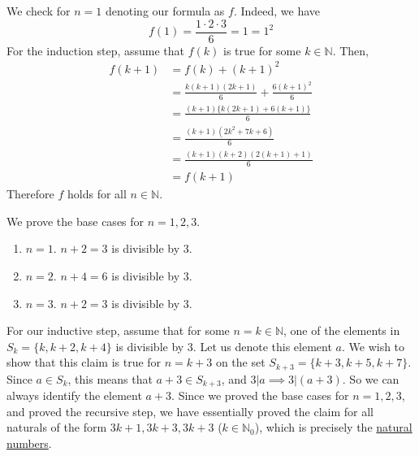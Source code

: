   \begin{exercise}
    We check for $n = 1$ denoting our formula as $f$. Indeed, we have 
    \begin{equation}
      f(1) = \frac{1 \cdot 2 \cdot 3}{6} = 1 = 1^2
    \end{equation} 
    For the induction step, assume that $f(k)$ is true for some $k \in \mathbb{N}$. Then, 
    \begin{align}
      f(k+1) & = f(k) + (k+1)^2 \\
             & = \frac{k (k + 1) (2k + 1)}{6} + \frac{6 (k+1)^2}{6} \\
             & = \frac{(k+1) \{ k (2k+1) + 6(k+1)\}}{6} \\
             & = \frac{(k+1) (2k^2 + 7k + 6)}{6} \\
             & = \frac{(k+1)(k+2)(2(k+1) + 1)}{6} \\
             & = f(k+1)
    \end{align}
    Therefore $f$ holds for all $n \in \mathbb{N}$. 
  \end{exercise} 

  \begin{exercise}
    We prove the base cases for $n = 1, 2, 3$. 
    \begin{enumerate}
      \item $n = 1$. $n+2 = 3$ is divisible by $3$. 
      \item $n = 2$. $n+4 = 6$ is divisible by $3$. 
      \item $n = 3$. $n+2 = 3$ is divisible by $3$. 
    \end{enumerate} 
    For our inductive step, assume that for some $n = k \in \mathbb{N}$, one of the elements in $S_k = \{k, k+2, k+4\}$ is divisible by $3$. Let us denote this element $a$. We wish to show that this claim is true for $n = k+3$ on the set $S_{k+3} = \{k+3, k+5, k+7\}$. Since $a \in S_k$, this means that $a+3 \in S_{k+3}$, and $3 | a \implies 3 | (a+3)$. So we can always identify the element $a+3$. Since we proved the base cases for $n=1, 2, 3$, and proved the recursive step, we have essentially proved the claim for all naturals of the form $3k+1, 3k+3, 3k+3$ ($k \in \mathbb{N}_0$), which is precisely the \hyperref[def:naturals]{natural numbers}. 
  \end{exercise}

